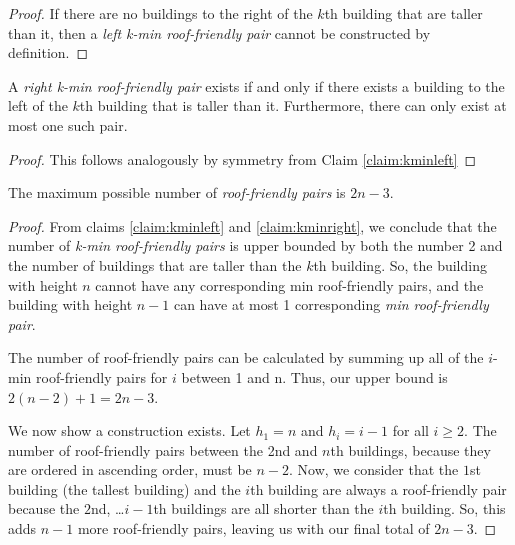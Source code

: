 \documentclass[10pt]{../usamts}
\begin{document}
\begin{solution}{3}
\begin{proof}
    If there are no buildings to the right of the $k$th building that are taller than it, then a \textit{left k-min roof-friendly pair} cannot be constructed by definition.
\end{proof}

\begin{claim}
    A \textit{right k-min roof-friendly pair} exists if and only if there exists a building to the left of the $k$th building that is taller than it. Furthermore, there can only exist at most one such pair.
    \label{claim:kminright}
\end{claim}

\begin{proof}
    This follows analogously by symmetry from Claim \ref{claim:kminleft}
\end{proof}

\begin{claim}
    The maximum possible number of \textit{roof-friendly pairs} is $\boxed{2n-3}$.
\end{claim}

\begin{proof}
     From claims \ref{claim:kminleft} and \ref{claim:kminright}, we conclude that the number of \textit{k-min roof-friendly pairs} is upper bounded by both the number 2 and the number of buildings that are taller than the $k$th building. So, the building with height $n$ cannot have any corresponding min roof-friendly pairs, and the building with height $n-1$ can have at most 1 corresponding \textit{min roof-friendly pair}.
    
    The number of roof-friendly pairs can be calculated by summing up all of the $i$-min roof-friendly pairs for $i$ between 1 and n. Thus, our upper bound is $2(n-2) + 1 = 2n-3$.
    
    We now show a construction exists. Let $h_1 = n$ and $h_i = i-1$ for all $i \ge 2$. The number of roof-friendly pairs between the 2nd and $n$th buildings, because they are ordered in ascending order, must be $n-2$. Now, we consider that the $1$st building (the tallest building) and the $i$th building are always a roof-friendly pair because the $2$nd, \dots $i-1$th buildings are all shorter than the $i$th building. So, this adds $n-1$ more roof-friendly pairs, leaving us with our final total of $2n-3$.
\end{proof}

\end{solution}
\end{document}
